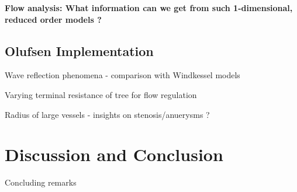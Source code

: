 \documentclass{beamer}
\begin{document}

\begin{frame}
	\begin{center}
		\Large{\textbf{Flow analysis: What information can we get from such 1-dimensional, reduced order models ?}}
	\end{center}
\end{frame}

\subsection{Olufsen Implementation}

\begin{frame}{Wave reflection phenomena - comparison with Windkessel models}

\end{frame}


\begin{frame}{Varying terminal resistance of tree for flow regulation}

\end{frame}


\begin{frame}{Radius of large vessels - insights on stenosis/anuerysms ?}

\end{frame}

\section{Discussion and Conclusion}

\begin{frame}{Concluding remarks}

\end{frame}
\end{document}
